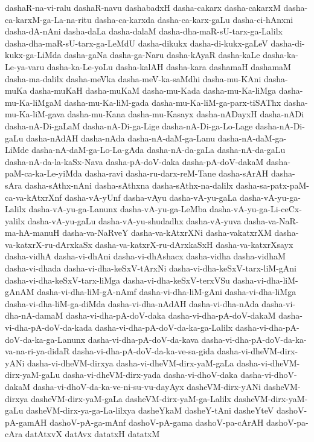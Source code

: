{dashaR-na-vi-ralu
dashaR-navu
dashabadxH
dasha-cakarx
dasha-cakarxM
dasha-ca-karxM-ga-La-na-ritu
dasha-ca-karxda
dasha-ca-karx-gaLu
dasha-ci-hAnxni
dasha-dA-nAni
dasha-daLa
dasha-dalaM
dasha-dha-maR-sU-tarx-ga-Lalilx
dasha-dha-maR-sU-tarx-ga-LeMdU
dasha-dikukx
dasha-di-kukx-gaLeV
dasha-di-kukx-ga-LiMda
dasha-gaNa
dasha-ga-Naru
dasha-kAyaR
dasha-kaLe
dasha-ka-Le-ya-varu
dasha-ka-Le-yoLu
dasha-kalAH
dasha-kara
dashamaH
dashamaM
dasha-ma-dalilx
dasha-meVka
dasha-meV-ka-saMdhi
dasha-mu-KAni
dasha-muKa
dasha-muKaH
dasha-muKaM
dasha-mu-Kada
dasha-mu-Ka-liMga
dasha-mu-Ka-liMgaM
dasha-mu-Ka-liM-gada
dasha-mu-Ka-liM-ga-parx-tiSAThx
dasha-mu-Ka-liM-gava
dasha-mu-Kana
dasha-mu-Kasayx
dasha-nADayxH
dasha-nADi
dasha-nA-Di-gaLaM
dasha-nA-Di-ga-Lige
dasha-nA-Di-ga-Lo-Lage
dasha-nA-Di-gaLu
dasha-nAdAH
dasha-nAda
dasha-nA-daM-ga-Lanu
dasha-nA-daM-ga-LiMde
dasha-nA-daM-ga-Lo-La-gAda
dasha-nA-da-gaLa
dasha-nA-da-gaLu
dasha-nA-da-la-kaSx-Nava
dasha-pA-doV-daka
dasha-pA-doV-dakaM
dasha-paM-ca-ka-Le-yiMda
dasha-ravi
dasha-ru-darx-reM-Tane
dasha-sArAH
dasha-sAra
dasha-sAthx-nAni
dasha-sAthxna
dasha-sAthx-na-dalilx
dasha-sa-patx-paM-ca-va-kAtxrXnf
dasha-vA-yUnf
dasha-vAyu
dasha-vA-yu-gaLa
dasha-vA-yu-ga-Lalilx
dasha-vA-yu-ga-Lanunx
dasha-vA-yu-ga-LeMba
dasha-vA-yu-ga-Li-ceCx-yalilx
dasha-vA-yu-gaLu
dasha-vA-yu-shudadhx
dasha-vA-yuva
dasha-va-NaR-ma-hA-manuH
dasha-va-NaRveY
dasha-va-kAtxrXNi
dasha-vakatxrXM
dasha-va-katxrX-ru-dArxkaSx
dasha-va-katxrX-ru-dArxkaSxH
dasha-va-katxrXsayx
dasha-vidhA
dasha-vi-dhAni
dasha-vi-dhAshacx
dasha-vidha
dasha-vidhaM
dasha-vi-dhada
dasha-vi-dha-keSxV-tArxNi
dasha-vi-dha-keSxV-tarx-liM-gAni
dasha-vi-dha-keSxV-tarx-liMga
dasha-vi-dha-keSxV-terxVSu
dasha-vi-dha-liM-gAnAM
dasha-vi-dha-liM-gA-nAmf
dasha-vi-dha-liM-gAni
dasha-vi-dha-liMga
dasha-vi-dha-liM-ga-diMda
dasha-vi-dha-nAdAH
dasha-vi-dha-nAda
dasha-vi-dha-nA-damaM
dasha-vi-dha-pA-doV-daka
dasha-vi-dha-pA-doV-dakaM
dasha-vi-dha-pA-doV-da-kada
dasha-vi-dha-pA-doV-da-ka-ga-Lalilx
dasha-vi-dha-pA-doV-da-ka-ga-Lanunx
dasha-vi-dha-pA-doV-da-kava
dasha-vi-dha-pA-doV-da-ka-va-na-ri-ya-didaR
dasha-vi-dha-pA-doV-da-ka-ve-sa-gida
dasha-vi-dheVM-dirx-yANi
dasha-vi-dheVM-dirxya
dasha-vi-dheVM-dirx-yaM-gaLa
dasha-vi-dheVM-dirx-yaM-gaLu
dasha-vi-dheVM-dirx-yada
dasha-vi-dhoV-daka
dasha-vi-dhoV-dakaM
dasha-vi-dhoV-da-ka-ve-ni-su-vu-dayAyx
dasheVM-dirx-yANi
dasheVM-dirxya
dasheVM-dirx-yaM-gaLa
dasheVM-dirx-yaM-ga-Lalilx
dasheVM-dirx-yaM-gaLu
dasheVM-dirx-ya-ga-La-lilxya
dasheYkaM
dasheY-tAni
dasheYteV
dashoV-pA-gamAH
dashoV-pA-ga-mAnf
dashoV-pA-gama
dashoV-pa-cArAH
dashoV-pa-cAra
datAtxvX
datAvx
datatxH
datatxM
}

